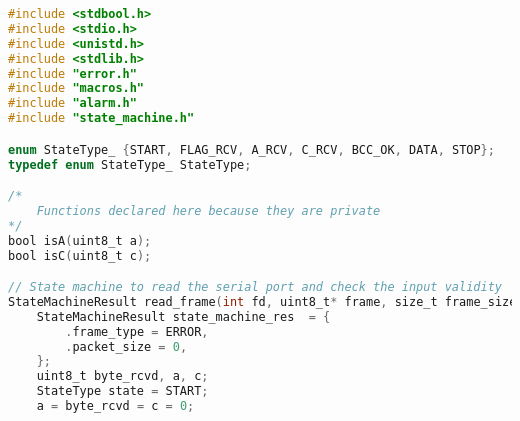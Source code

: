 \begin{lstlisting}[language=C, caption=state_machine.c]
#include <stdbool.h>
#include <stdio.h>
#include <unistd.h>
#include <stdlib.h>
#include "error.h"
#include "macros.h"
#include "alarm.h"
#include "state_machine.h"

enum StateType_ {START, FLAG_RCV, A_RCV, C_RCV, BCC_OK, DATA, STOP};
typedef enum StateType_ StateType;

/*
    Functions declared here because they are private
*/
bool isA(uint8_t a);
bool isC(uint8_t c);

// State machine to read the serial port and check the input validity
StateMachineResult read_frame(int fd, uint8_t* frame, size_t frame_size) {
    StateMachineResult state_machine_res  = {
        .frame_type = ERROR,
        .packet_size = 0,
    };
    uint8_t byte_rcvd, a, c;
    StateType state = START;
    a = byte_rcvd = c = 0;


\end{lstlisting}
